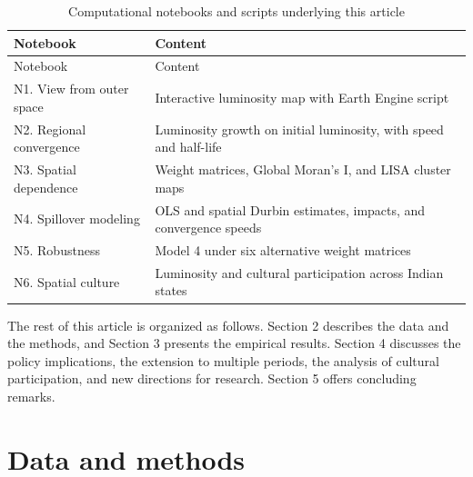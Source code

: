 \documentclass[
  letterpaper,
  DIV=11,
  numbers=noendperiod]{scrartcl}
\begin{document}
\begin{longtable}[]{@{}
  >{\raggedright\arraybackslash}p{}
  >{\raggedright\arraybackslash}p{}@{}}
\caption{Computational notebooks and scripts underlying this
article}\label{tbl-notebooks}\tabularnewline
\toprule\noalign{}
\begin{minipage}[b]{\linewidth}\raggedright
Notebook
\end{minipage} & \begin{minipage}[b]{\linewidth}\raggedright
Content
\end{minipage} \\
\midrule\noalign{}
\endfirsthead
\toprule\noalign{}
\begin{minipage}[b]{\linewidth}\raggedright
Notebook
\end{minipage} & \begin{minipage}[b]{\linewidth}\raggedright
Content
\end{minipage} \\
\midrule\noalign{}
\endhead
\bottomrule\noalign{}
\endlastfoot
N1. View from outer space & Interactive luminosity map with Earth Engine
script \\
N2. Regional convergence & Luminosity growth on initial luminosity, with
speed and half-life \\
N3. Spatial dependence & Weight matrices, Global Moran's I, and LISA
cluster maps \\
N4. Spillover modeling & OLS and spatial Durbin estimates, impacts, and
convergence speeds \\
N5. Robustness & Model 4 under six alternative weight matrices \\
N6. Spatial culture & Luminosity and cultural participation across
Indian states \\
\end{longtable}

The rest of this article is organized as follows. Section 2 describes
the data and the methods, and Section 3 presents the empirical results.
Section 4 discusses the policy implications, the extension to multiple
periods, the analysis of cultural participation, and new directions for
research. Section 5 offers concluding remarks.

\section{Data and methods}\label{data-and-methods}
\end{document}

